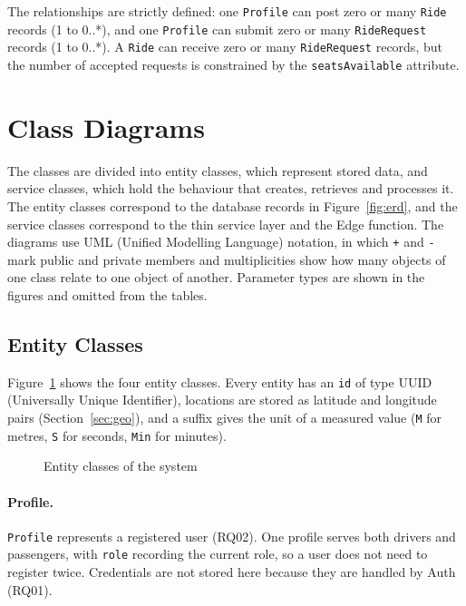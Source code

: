 The relationships are strictly defined: one \texttt{Profile} can post zero or many \texttt{Ride} records (1 to 0..*), and one \texttt{Profile} can submit zero or many \texttt{RideRequest} records (1 to 0..*). A \texttt{Ride} can receive zero or many \texttt{RideRequest} records, but the number of accepted requests is constrained by the \texttt{seatsAvailable} attribute.

\section{Class Diagrams}

The classes are divided into entity classes, which represent stored data, and service classes, which hold the behaviour that creates, retrieves and processes it. The entity classes correspond to the database records in Figure~\ref{fig:erd}, and the service classes correspond to the thin service layer and the Edge function. The diagrams use UML (Unified Modelling Language) notation, in which \texttt{+} and \texttt{-} mark public and private members and multiplicities show how many objects of one class relate to one object of another. Parameter types are shown in the figures and omitted from the tables.

\subsection{Entity Classes}
\label{sec:entityclasses}

Figure~\ref{fig:entity} shows the four entity classes. Every entity has an \texttt{id} of type UUID (Universally Unique Identifier), locations are stored as latitude and longitude pairs (Section~\ref{sec:geo}), and a suffix gives the unit of a measured value (\texttt{M} for metres, \texttt{S} for seconds, \texttt{Min} for minutes).

\begin{figure}[htbp]
  \centering
  \caption{Entity classes of the system}
  \label{fig:entity}
\end{figure}

\paragraph{Profile.} \texttt{Profile} represents a registered user (RQ02). One profile serves both drivers and passengers, with \texttt{role} recording the current role, so a user does not need to register twice. Credentials are not stored here because they are handled by Auth (RQ01).

